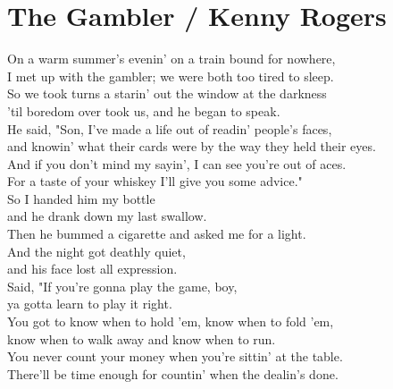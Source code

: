 \section{The Gambler / Kenny Rogers}\label{ch:thegambler}
\Amajor
\DmajorEasy
\Eminor
\Gmajor

On a  warm summer's evenin' on a  train bound for  nowhere,\\
I met up with the gambler; we were both too tired to  sleep.\\
So  we took turns a starin' out the  window at the  darkness\\
'til  boredom over  took us, and  he began to  speak.\\
He said,  "Son, I've made a life out of  readin' people's  faces,\\
and knowin' what their cards were by the way they held their  eyes.\\
And if  you don't mind my sayin', I can  see you're out of  aces.\\
For a  taste of your  whiskey I'll  give you some  advice."\\
So I  handed him my bottle\\
and he  drank down my last  swallow.\\
Then he bummed a cigarette and asked me for a  light.\\
And the  night got deathly quiet,\\
and his  face lost all expression.\\
Said, "If you're  gonna play the  game, boy,\\
ya gotta  learn to play it  right.\\
You got to  know when to hold 'em,  know when to  fold 'em,\\
 know when to  walk away and know when to  run.\\
You never  count  your  money when you're  sittin' at the  table.\\
There'll be  time enough for  countin'  when the dealin's  done.\\
